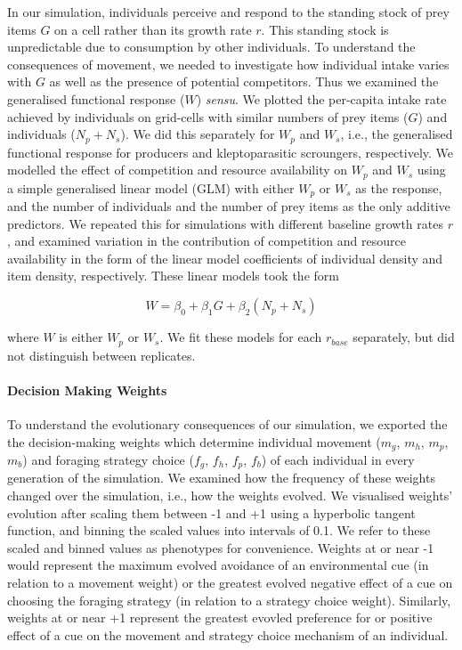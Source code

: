 \documentclass[11pt]{article}
\begin{document}
In our simulation, individuals perceive and respond to the standing stock of prey items $G$ on a cell rather than its growth rate $r$.
This standing stock is unpredictable due to consumption by other individuals.
To understand the consequences of movement, we needed to investigate how individual intake varies with $G$ as well as the presence of potential competitors.
Thus we examined the generalised functional response ($W$) \textit{sensu}\citet{meer1997}.
We plotted the per-capita intake rate achieved by individuals on grid-cells with similar numbers of prey items ($G$) and individuals ($N_p + N_s$).
We did this separately for $W_p$ and $W_s$, i.e., the generalised functional response for producers and kleptoparasitic scroungers, respectively.
We modelled the effect of competition and resource availability on $W_p$ and $W_s$ using a simple generalised linear model (GLM) with either $W_p$ or $W_s$ as the response, and the number of individuals and the number of prey items as the only additive predictors.
We repeated this for simulations with different baseline growth rates $r$, and examined variation in the contribution of competition and resource availability in the form of the linear model coefficients of individual density and item density, respectively.
These linear models took the form
\begin{linenomath*}
    \begin{equation*}
        W = \beta_0 + \beta_1 G + \beta_2 (N_p + N_s)
    \end{equation*}
\end{linenomath*}
where $W$ is either $W_p$ or $W_s$.
We fit these models for each $r_{base}$ separately, but did not distinguish between replicates.

\paragraph{Decision Making Weights}

To understand the evolutionary consequences of our simulation, we exported the the decision-making weights which determine individual movement ($m_g$, $m_h$, $m_p$, $m_b$) and foraging strategy choice ($f_g$, $f_h$, $f_p$, $f_b$) of each individual in every generation of the simulation.
We examined how the frequency of these weights changed over the simulation, i.e., how the weights evolved.
We visualised weights' evolution after scaling them between -1 and +1 using a hyperbolic tangent function, and binning the scaled values into intervals of 0.1.
We refer to these scaled and binned values as phenotypes for convenience.
Weights at or near -1 would represent the maximum evolved avoidance of an environmental cue (in relation to a movement weight) or the greatest evolved negative effect of a cue on choosing the foraging strategy (in relation to a strategy choice weight).
Similarly, weights at or near +1 represent the greatest evovled preference for or positive effect of a cue on the movement and strategy choice mechanism of an individual.
\end{document}
